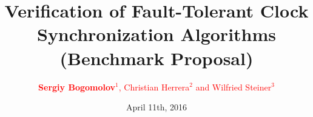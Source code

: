 \documentclass[serif]{beamer}
\begin{document}
\title{\centering \textbf{Verification of Fault-Tolerant Clock\\
Synchronization Algorithms\\ (Benchmark Proposal)}} 
\author{\textcolor{red}{{\bf{Sergiy Bogomolov}}$^{1}$, Christian Herrera$^{2}$ and Wilfried Steiner$^{3}$}  
	}
\date{April 11th, 2016}
\begin{frame}
\titlepage
\end{frame}
 




\end{document}
